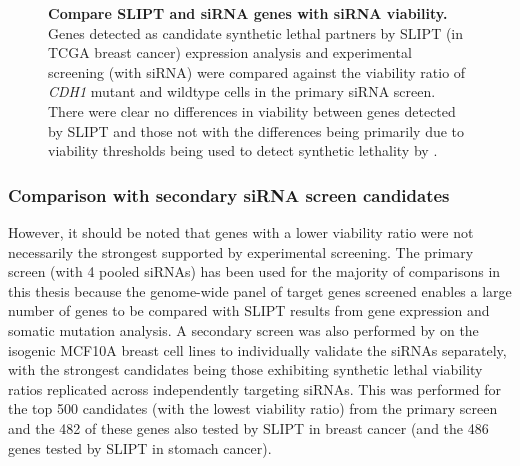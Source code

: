 \begin{figure}[!htp]
\begin{mdframed}
\begin{center}
   \end{center}
   \caption[Compare SLIPT and siRNA genes with siRNA viability]{\small \textbf{Compare \gls{SLIPT} and \gls{siRNA} genes with \gls{siRNA} viability.} Genes detected as candidate synthetic lethal partners by \gls{SLIPT} (in TCGA breast cancer) expression analysis and experimental screening (with \gls{siRNA}) were compared against the viability ratio of \textit{CDH1} mutant and wildtype cells in the primary \gls{siRNA} screen. There were clear no differences in viability between genes detected by \gls{SLIPT} and those not with the differences being primarily due to viability thresholds being used to detect synthetic lethality by \citet{Telford2015}. 
}
\label{fig:compare_viability_SL}
\end{mdframed}
\end{figure}

\FloatBarrier

\subsubsection{Comparison with secondary siRNA screen candidates}

However, it should be noted that genes with a lower viability ratio were not necessarily the strongest supported by experimental screening. The primary screen (with 4 pooled \glspl{siRNA}) has been used for the majority of comparisons in this thesis because the genome-wide panel of target genes screened enables a large number of genes to be compared with \gls{SLIPT} results from gene expression and somatic mutation analysis. A secondary screen was also performed by \citet{Telford2015} on the isogenic MCF10A breast cell lines to individually validate the \glspl{siRNA} separately, with the strongest candidates being those exhibiting synthetic lethal viability ratios replicated across independently targeting \glspl{siRNA}. This was performed for the top 500 candidates (with the lowest viability ratio) from the primary screen and the 482 of these genes also tested by \gls{SLIPT} in breast cancer (and the 486 genes tested by \gls{SLIPT} in stomach cancer).

